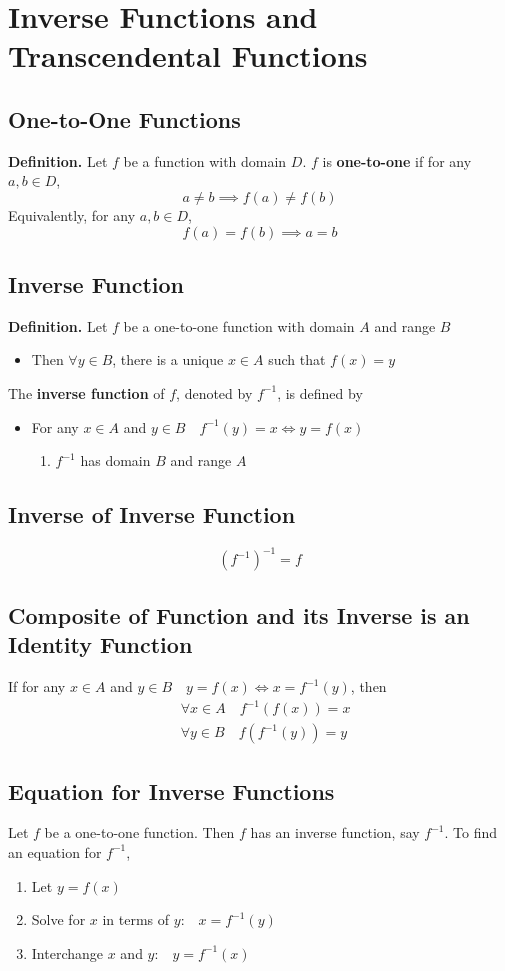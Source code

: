 \documentclass[../ma2002_notes.tex]{subfiles}
\begin{document}
\section{Inverse Functions and Transcendental Functions}
\subsection{One-to-One Functions}
\textbf{Definition.} Let \(f\) be a function with domain \(D\). \(f\) is \textbf{one-to-one} if for any \(a,b\in D\),
\[a\ne b\implies f(a)\ne f(b)\]
Equivalently, for any \(a,b\in D\),
\[f(a)=f(b)\implies a=b\]

\subsection{Inverse Function}
\textbf{Definition.} Let \(f\) be a one-to-one function with domain \(A\) and range \(B\)
\begin{itemize}
	\item Then \(\forall y\in B\), there is a unique \(x\in A\) such that \(f(x)=y\)
\end{itemize}
The \textbf{inverse function} of \(f\), denoted by \(f^{-1}\), is defined by
\begin{itemize}
	\item For any \(x\in A\) and \(y\in B\quad f^{-1}(y)=x\iff y=f(x)\)
	\begin{enumerate}
		\item\(f^{-1}\) has domain \(B\) and range \(A\)
	\end{enumerate}
\end{itemize}

\subsection{Inverse of Inverse Function}
\[(f^{-1})^{-1}=f\]

\subsection{Composite of Function and its Inverse is an Identity Function}
If for any \(x\in A\) and \(y\in B\quad y=f(x)\iff x=f^{-1}(y)\), then
\begin{align*}
	&\forall x\in A\quad f^{-1}(f(x))=x\\
	&\forall y\in B\quad f(f^{-1}(y))=y
\end{align*}

\subsection{Equation for Inverse Functions}
Let \(f\) be a one-to-one function. Then \(f\) has an inverse function, say \(f^{-1}\). To find an equation for \(f^{-1}\),
\begin{enumerate}
	\item Let \(y=f(x)\)
	\item Solve for \(x\) in terms of \(y\):\(\quad x=f^{-1}(y)\)
	\item Interchange \(x\) and \(y\):\(\quad y=f^{-1}(x)\)
\end{enumerate}
\end{document}
